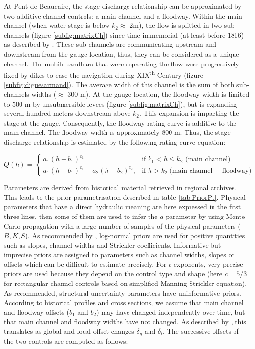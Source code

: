 \documentclass[11pt]{article}
\begin{document}
         At Pont de Beaucaire, the stage-discharge relationship can be approximated by two additive channel controls: a main channel and a floodway. Within the main channel (when water stage is below $k_2 \approx$ 2m), the flow is splitted in two sub-channels (figure \ref{subfig:matrixCh}) since time immemorial (at least before 1816) as described by \citet{armand_ii_1907}. These sub-channels are communicating upstream and downstream from the gauge location, thus, they can be considered as a unique channel. The mobile sandbars that were separating the flow were progressively fixed by dikes to ease the navigation during XIX\textsuperscript{th} Century (figure \ref{subfig:diguesarmand}). The average width of this channel is the sum of both sub-channels widths ($\approx$ 300 m).  At the gauge location, the floodway width is limited to 500 m by unsubmersible levees  (figure \ref{subfig:matrixCh}), but is expanding several hundred meters downstream above $k_2$. This expansion is impacting the stage at the gauge. Consequently, the floodway rating curve is additive to the main channel. The floodway width is approximately 800 m. Thus, the stage discharge relationship is estimated by the following rating curve equation:

        \begin{equation}
        Q(h) =
          \begin{cases}
           a_1(h-b_1)^{c_1}, & \text{if $k_1 < h \leq k_2$ (main channel) }\\
           a_1(h-b_1)^{c_1}+ a_2(h-b_2)^{c_2}, & \text{if $h > k_2$ (main channel + floodway)}
          \end{cases}
          \label{eq:RcPt}
        \end{equation}
        
       Parameters are derived from historical material retrieved in regional archives. This leads to the prior parametrisation described in table \ref{tab:PriorPt}. Physical parameters that have a direct hydraulic meaning are here expressed in the first three lines, then some of them are used to infer the $a$ parameter by using Monte Carlo propagation with a large number of samples of the physical parameters ($B,K,S$). As recommended by \citet{le_coz_combining_2014}, log-normal priors are used for positive quantities such as slopes, channel widths and Strickler coefficients. Informative but imprecise priors are assigned to parameters such as channel widths, slopes or offsets which can be difficult to estimate precisely. For $c$ exponents, very precise priors are used because they depend on the control type and shape (here $c=5/3$ for rectangular channel controls based on simplified Manning-Strickler equation). As recommended, structural uncertainty parameters have uninformative priors. According to historical profiles and cross sections, we assume that main channel and floodway offsets ($b_1$ and $b_2$) may have changed independently over time, but that main channel and floodway widths have not changed. As described by \citet{mansanarez_shift_2019}, this translates as global and local offset changes $\delta_g$ and $\delta_l$. The successive offsets of the two controls are computed as follows:
       
\end{document}
